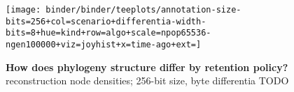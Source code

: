 \begin{figure*}
  \centering
    \texttt{[image: binder/binder/teeplots/annotation-size-bits=256+col=scenario+differentia-width-bits=8+hue=kind+row=algo+scale=npop65536-ngen100000+viz=joyhist+x=time-ago+ext=]}
\caption{%
  \textbf{How does phylogeny structure differ by retention policy?}
  reconstruction node densities; 256-bit size, byte differentia
  TODO
}
  \label{fig:recency-structure}

\end{figure*}
